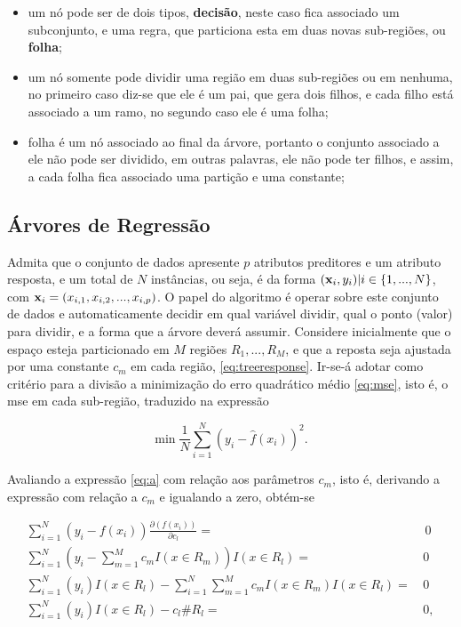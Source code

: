 \begin{itemize}
\item um nó pode ser de dois tipos, {\bf decisão}, neste caso fica associado um subconjunto, e uma regra, que particiona esta em duas novas sub-regiões, ou {\bf folha};
\item um nó somente pode dividir uma região em duas sub-regiões ou em nenhuma, no primeiro caso diz-se que ele é um pai, que gera dois filhos, e cada filho está associado a um ramo, no segundo caso ele é uma folha;
\item folha é um nó associado ao final da árvore, portanto o conjunto associado a ele não pode ser dividido, em outras palavras, ele não pode ter filhos, e assim, a cada folha fica associado uma partição e uma constante;
\end{itemize}

\subsection{Árvores de Regressão}

Admita que o conjunto de dados apresente $p$ atributos preditores e um atributo resposta, e um total de $N$ instâncias, ou seja, é da forma $({\bf x}_i,y_i)|i\in\{1,...,N\}$, com ${\bf x}_i=(x_{i,1}, x_{i,2}, ..., x_{i,p})$. O papel do algoritmo é operar sobre este conjunto de dados e automaticamente decidir em qual variável dividir, qual o ponto (valor) para dividir, e a forma que a árvore deverá assumir. Considere inicialmente que o espaço esteja particionado em $M$ regiões $R_1,...,R_M$, e que a reposta seja ajustada por uma constante $c_m$ em cada região, \eqref{eq:treeresponse}. Ir-se-á adotar como critério para a divisão a minimização do erro quadrático médio \eqref{eq:mse}, isto é, o mse em cada sub-região, traduzido na expressão

\begin{equation}\label{eq:a}
\min\frac{1}{N}\sum_{i=1}^N(y_i-\hat{f}(x_i))^2\mbox{.}~
\end{equation}

Avaliando a expressão \eqref{eq:a} com relação aos parâmetros $c_m$, isto é, derivando a expressão com relação a $c_m$ e igualando a zero, obtém-se

\begin{align}
\sum_{i=1}^N(y_i-f(x_i))\frac{\partial(f(x_i))}{\partial{c_l}}=&\,0 \nonumber \\
\sum_{i=1}^N\left(y_i-\sum_{m=1}^Mc_mI(x\in{R_m})\right)I(x\in{R_l})=\,&0 \nonumber \\
\sum_{i=1}^N(y_i)I(x\in{R_l}) - \sum_{i=1}^N\sum_{m=1}^Mc_mI(x\in{R_m})I(x\in{R_l})=\,&0 \nonumber\\
\sum_{i=1}^N(y_i)I(x\in{R_l}) - c_l \#R_l=\,&0\mbox{,}~
\end{align}

